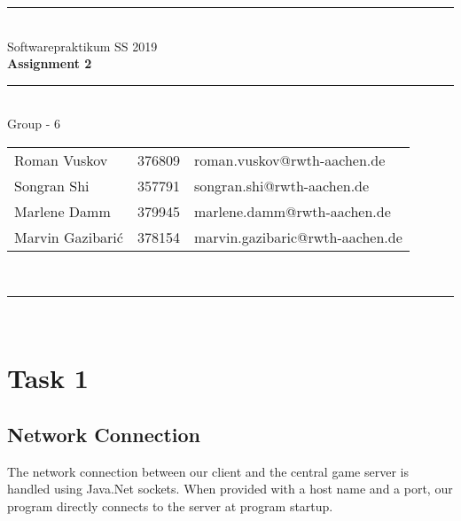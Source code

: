 \documentclass[a4paper,12pt]{article}
\begin{document}
    
    \begin{center}
        \rule{\textwidth}{0.1pt}\\[1cm]
        
        \Large Softwarepraktikum SS 2019\\\bf Assignment 2
    \end{center}
    
    
    \begin{center}
        
        \rule{\textwidth}{0.1pt}\\[0.5cm]
        
        {\Large Group - 6\\[5mm]}
        
        \begin{tabular}{lll}
            
            Roman Vuskov & 376809 & roman.vuskov@rwth-aachen.de \\
            
            Songran Shi & 357791 & songran.shi@rwth-aachen.de \\
            
            Marlene Damm & 379945 & marlene.damm@rwth-aachen.de \\
            
            Marvin Gazibarić & 378154 & marvin.gazibaric@rwth-aachen.de \\
            
        \end{tabular}\\[0.5cm]
        
        \rule{\textwidth}{0.1pt}\\[1cm]
        
    \end{center}
    
    \newpage
    \section{Task 1}
    
    \subsection{Network Connection}
    
    The network connection between our client and the central game server is handled using Java.Net sockets. When provided with a host name and a port, our program directly connects to the server at program startup.
    
\end{document}
